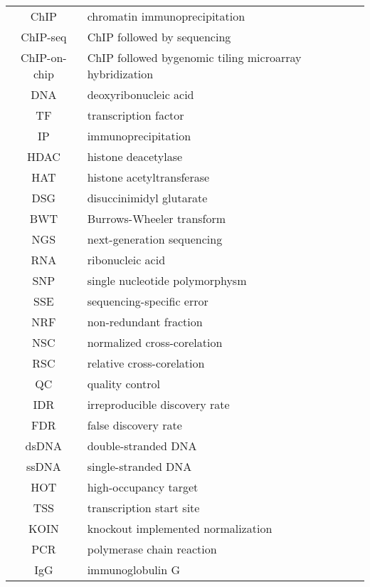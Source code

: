 \documentclass[12pt,a4paper]{report}
\begin{document}



\tableofcontents


\begin{tabular}{c l}
	ChIP & chromatin immunoprecipitation \\
	ChIP-seq & ChIP followed by sequencing \\
	ChIP-on-chip & ChIP followed bygenomic tiling microarray hybridization \\
	DNA & deoxyribonucleic acid \\
	TF & transcription factor \\
	IP & immunoprecipitation \\
	HDAC & histone deacetylase \\
	HAT & histone acetyltransferase \\
	DSG & disuccinimidyl glutarate \\
	BWT & Burrows-Wheeler transform \\
	NGS & next-generation sequencing \\
	RNA & ribonucleic acid \\
	SNP & single nucleotide polymorphysm \\
	SSE & sequencing-specific error \\
	NRF & non-redundant fraction \\
	NSC & normalized cross-corelation \\
	RSC & relative cross-corelation \\
	QC & quality control \\
	IDR & irreproducible discovery rate \\
	FDR & false discovery rate \\
	dsDNA & double-stranded DNA \\
	ssDNA & single-stranded DNA \\
	HOT & high-occupancy target \\
	TSS & transcription start site \\
	KOIN & knockout implemented normalization \\
	PCR & polymerase chain reaction \\
	IgG & immunoglobulin G \\
	
\end{tabular}
\end{document}
